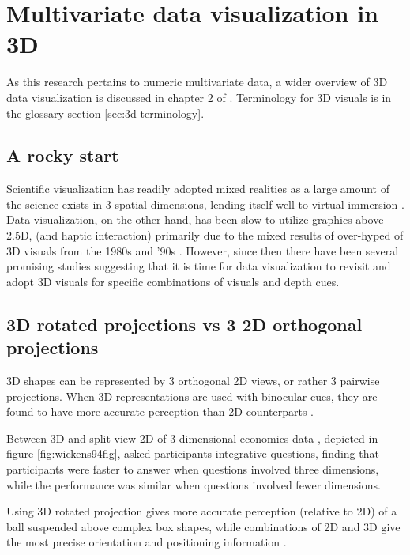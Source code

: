 \documentclass{monashthesis}
\begin{document}
\section{Multivariate data visualization in 3D}\label{sec:3d}

As this research pertains to numeric multivariate data, a wider overview
of 3D data visualization is discussed in chapter 2 of
\textcite{marriott_immersive_2018}. Terminology for 3D visuals is in the
glossary section \ref{sec:3d-terminology}.

\subsection{A rocky start}\label{a-rocky-start}

Scientific visualization has readily adopted mixed realities as a large
amount of the science exists in 3 spatial dimensions, lending itself
well to virtual immersion \autocite{marriott_immersive_2018}. Data
visualization, on the other hand, has been slow to utilize graphics
above 2.5D, (and haptic interaction) primarily due to the mixed results
of over-hyped of 3D visuals from the 1980s and '90s
\autocite{munzner_visualization_2014}. However, since then there have
been several promising studies suggesting that it is time for data
visualization to revisit and adopt 3D visuals for specific combinations
of visuals and depth cues.

\subsection{3D rotated projections vs 3 2D orthogonal
projections}\label{d-rotated-projections-vs-3-2d-orthogonal-projections}

3D shapes can be represented by 3 orthogonal 2D views, or rather 3
pairwise projections. When 3D representations are used with binocular
cues, they are found to have more accurate perception than 2D
counterparts \autocite[depicted in figure
\ref{fig:lee86fig}]{lee_effects_1986}.

Between 3D and split view 2D of 3-dimensional economics data
\textcite{wickens_implications_1994}, depicted in figure
\ref{fig:wickens94fig}, asked participants integrative questions,
finding that participants were faster to answer when questions involved
three dimensions, while the performance was similar when questions
involved fewer dimensions.

Using 3D rotated projection gives more accurate perception (relative to
2D) of a ball suspended above complex box shapes, while combinations of
2D and 3D give the most precise orientation and positioning information
\autocite[depicted in figure
\ref{fig:tory06fig}]{tory_visualization_2006}.
\end{document}
